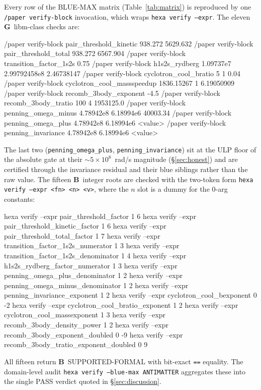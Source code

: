 \documentclass[11pt,a4paper]{article}
\newcommand{\tierBlue}{\textbf{B}}
\newcommand{\tierGreen}{\textbf{G}}
\begin{document}
Every row of the BLUE-MAX matrix (Table~\ref{tab:matrix}) is reproduced by
one \texttt{/paper verify-block} invocation, which wraps
\texttt{hexa verify --expr}. The eleven \tierGreen\ libm-class checks are:

\begin{verdict}
/paper verify-block pair_threshold_kinetic      938.272 5629.632
/paper verify-block pair_threshold_total        938.272 6567.904
/paper verify-block transition_factor_1s2s      0.75
/paper verify-block h1s2s_rydberg               1.09737e7 2.99792458e8 2.46738147
/paper verify-block cyclotron_cool_bratio       5 1 0.04
/paper verify-block cyclotron_cool_massspeedup  1836.15267 1 6.19050909
/paper verify-block recomb_3body_exponent       -4.5
/paper verify-block recomb_3body_tratio         100 4 1953125.0
/paper verify-block penning_omega_minus         4.78942e8 6.18994e6 40003.34
/paper verify-block penning_omega_plus          4.78942e8 6.18994e6 <value>
/paper verify-block penning_invariance          4.78942e8 6.18994e6 <value>
\end{verdict}

\noindent The last two (\texttt{penning\_omega\_plus},
\texttt{penning\_invariance}) sit at the ULP floor of the absolute gate at
their $\sim\!5\times10^{8}$~rad/s magnitude (\S\ref{sec:honest}) and are
certified through the invariance residual and their blue siblings rather
than the raw value. The fifteen \tierBlue\ integer roots are checked with
the two-token form \texttt{hexa verify --expr <fn> <n> <v>}, where the $n$
slot is a dummy for the 0-arg constants:

\begin{verdict}
hexa verify --expr pair_threshold_factor                   1 6
hexa verify --expr pair_threshold_kinetic_factor           1 6
hexa verify --expr pair_threshold_total_factor             1 7
hexa verify --expr transition_factor_1s2s_numerator        1 3
hexa verify --expr transition_factor_1s2s_denominator      1 4
hexa verify --expr h1s2s_rydberg_factor_numerator          1 3
hexa verify --expr penning_omega_plus_denominator          1 2
hexa verify --expr penning_omega_minus_denominator         1 2
hexa verify --expr penning_invariance_exponent             1 2
hexa verify --expr cyclotron_cool_bexponent                0 -2
hexa verify --expr cyclotron_cool_bratio_exponent          1 2
hexa verify --expr cyclotron_cool_massexponent             1 3
hexa verify --expr recomb_3body_density_power              1 2
hexa verify --expr recomb_3body_exponent_doubled           0 -9
hexa verify --expr recomb_3body_tratio_exponent_doubled    0 9
\end{verdict}

\noindent All fifteen return \tierBlue\ SUPPORTED-FORMAL with bit-exact
\texttt{==} equality. The domain-level audit
\texttt{hexa verify --blue-max ANTIMATTER} aggregates these into the single
PASS verdict quoted in \S\ref{sec:discussion}.



\end{document}
